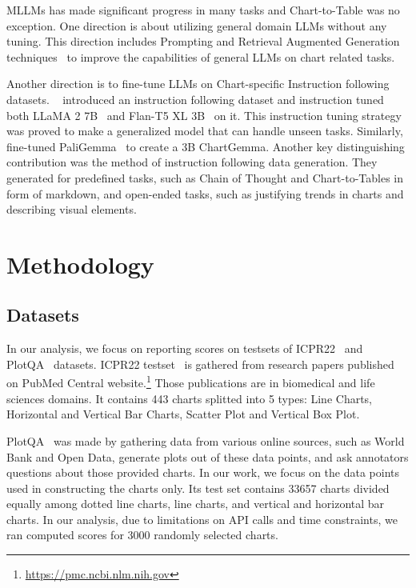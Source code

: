 \documentclass[
	letterpaper, %
]{jdf}
\begin{document}
MLLMs has made significant progress in many tasks and Chart-to-Table was no exception.
One direction is about utilizing general domain LLMs without any tuning.
This direction includes Prompting and Retrieval Augmented Generation techniques~\cite{cao2024graphinsight, voigt2023vist5} to improve the capabilities of general LLMs on chart related tasks.

Another direction is to fine-tune LLMs on Chart-specific Instruction following datasets.
~\cite{masry2024chartinstruct} introduced an instruction following dataset and instruction tuned both LLaMA 2 7B~\cite{touvron2023llama} and Flan-T5 XL 3B~\cite{chung2024scaling} on it.
This instruction tuning strategy was proved to make a generalized model that can handle unseen tasks.
Similarly,~\cite{masry2024chartgemma} fine-tuned PaliGemma~\cite{beyer2024paligemma} to create a 3B ChartGemma.
Another key distinguishing contribution was the method of instruction following data generation.
They generated for predefined tasks, such as Chain of Thought and Chart-to-Tables in form of markdown, and open-ended tasks, such as justifying trends in charts and describing visual elements.

\section{Methodology}\label{sect:methodology}
\subsection{Datasets}
In our analysis, we focus on reporting scores on testsets of ICPR22~\cite{rousseau2023pattern} and PlotQA~\cite{methani2020plotqa} datasets.
ICPR22 testset~\cite{rousseau2023pattern} is gathered from research papers published on PubMed Central website.\footnote{\href{https://pmc.ncbi.nlm.nih.gov}{https://pmc.ncbi.nlm.nih.gov}}
Those publications are in biomedical and life sciences domains.
It contains 443 charts splitted into 5 types: Line Charts, Horizontal and Vertical Bar Charts, Scatter Plot and Vertical Box Plot.

PlotQA~\cite{methani2020plotqa} was made by gathering data from various online sources, such as World Bank and Open Data, generate plots out of these data points, and ask annotators questions about those provided charts.
In our work, we focus on the data points used in constructing the charts only.
Its test set contains 33657 charts divided equally among dotted line charts, line charts, and vertical and horizontal bar charts.
In our analysis, due to limitations on API calls and time constraints, we ran computed scores for 3000 randomly selected charts.
\end{document}
